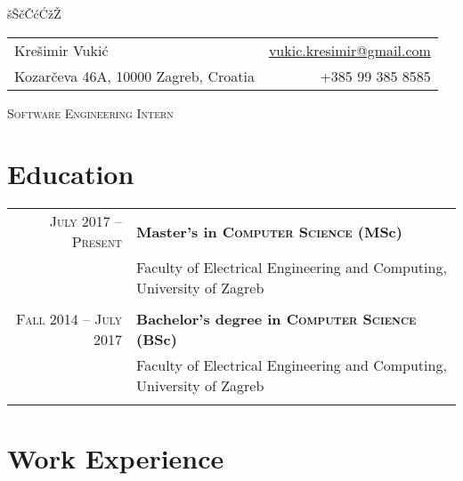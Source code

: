 \documentclass[lmodern,utf8,11pt]{my_cv}
\makeatletter
\newcommand{\resumeSubheading}[4]{
  \vspace{-1pt}\item
    \begin{tabular*}{0.97\textwidth}{l@{\extracolsep{\fill}}r}
      \textbf{#1} & #2 \\
      \textit{\small#3} & \textit{\small #4} \\
    \end{tabular*}\vspace{-5pt}
}
\newcommand{\resumeSubHeadingListStart}{\begin{itemize}}
\newcommand{\resumeSubHeadingListEnd}{\end{itemize}}
\makeatother
\begin{document}
\v{s}\v{S}\DJ\dj\v{c}\v{C}\'c\'C\v{z}\v{Z}
\begin{tabular*}{\textwidth}{l@{\extracolsep{\fill}}r}
  {\Large Krešimir Vukić} & \href{mailto:vukic.kresimir@gmail.com}{vukic.kresimir@gmail.com}\\
  {Kozarčeva 46A, 10000 Zagreb, Croatia} & +385 99 385 8585 \\
\end{tabular*}

  \begin{center}
  \textsc{Software Engineering Intern}
\end{center}

\section{Education}

\begin{tabular}{r | p{14cm}}
  \textsc{July 2017 -- Present}  & \textbf{Master's in \textsc{Computer Science} (MSc)} \\
                                  & \footnotesize{Faculty of Electrical Engineering and Computing, University of Zagreb} \\
                                  \\
  \textsc{Fall 2014 -- July 2017}  & \textbf{Bachelor's degree in \textsc{Computer Science} (BSc)} \\
                                   & \footnotesize{Faculty of Electrical Engineering and Computing, University of Zagreb} \\
  \multicolumn{2}{c}{} \\
\end{tabular}

\begin{comment}

\resumeSubHeadingListStart
  \resumeSubheading
    {University of Zagreb}{Zagreb, Croatia}
    {Master of Science in Computer Science (MSc)}{July 2017 -- Present}
  \resumeSubheading
    {University of Zagreb}{Zagreb, Croatia}
    {Bachelor of Computer Science (BSc)}{Fall 2014 -- July 2017}
\resumeSubHeadingListEnd

\end{comment}

\section{Work Experience}
\end{document}
